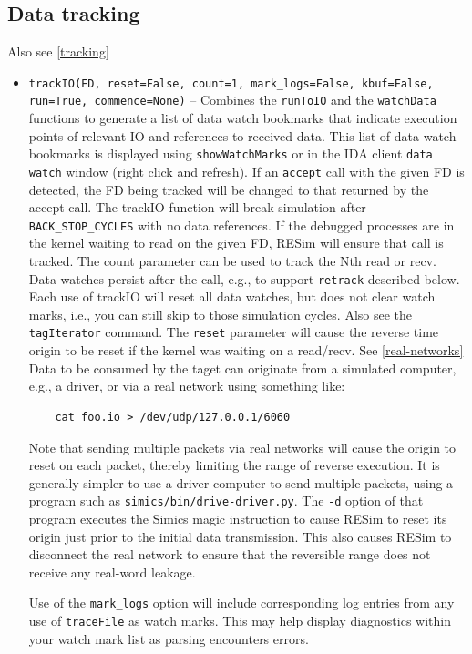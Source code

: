 \documentclass[titlepage]{article}
\begin{document}
\subsection{Data tracking}
Also see \ref{tracking}
\begin{itemize}

\item {\tt trackIO(FD, reset=False, count=1, mark\_logs=False, kbuf=False, run=True, commence=None)} -- Combines the {\tt runToIO} and the {\tt watchData} functions to generate a list of data watch bookmarks that indicate execution
points of relevant IO and references to received data.  This list of data watch bookmarks is displayed using {\tt showWatchMarks} or in the IDA client {\tt data watch} window (right click and refresh).
If an {\tt accept} call with the given FD is detected, the FD being tracked will be changed to that returned by the accept call.
The trackIO function will break simulation after {\tt BACK\_STOP\_CYCLES} with no data references. If the debugged processes are in the kernel waiting to read on the given
FD, RESim will ensure that call is tracked.  The count parameter can be used to track the Nth read or recv.   Data watches persist after the
call, e.g., to support {\tt retrack} described below.  Each use of trackIO will reset all data watches, but does not clear watch marks, i.e., you can still skip to those simulation cycles.  Also see 
the {\tt tagIterator} command.  The {\tt reset} parameter will cause the reverse time origin to be reset if the kernel was waiting on a read/recv. See \ref{real-networks}  Data to be consumed by the taget can originate from a simulated computer, e.g., a driver, or via a real network using something like:
\begin{verbatim}
    cat foo.io > /dev/udp/127.0.0.1/6060 
\end{verbatim}
\noindent Note that sending multiple packets via real networks will cause the origin to reset on each packet, thereby limiting the range of reverse execution.  It is generally simpler
to use a driver computer to send multiple packets, using a program such as {\tt simics/bin/drive-driver.py}.  The {\tt -d} option of that program executes the Simics magic instruction to cause RESim to reset
its origin just prior to the initial data transmission.  This also causes RESim to disconnect the real network to ensure that the reversible range does not receive any real-word leakage.

Use of the {\tt mark\_logs} option will include corresponding log entries from any use of {\tt traceFile} as watch marks.  This may help display diagnostics
within your watch mark list as parsing encounters errors.


\end{itemize}
\end{document}
